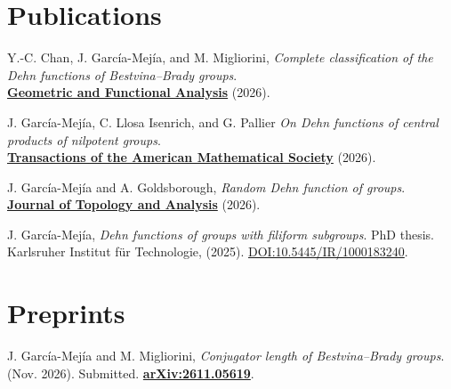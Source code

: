 \documentclass[a4paper,10pt]{article} %
\begin{document}
\section{Publications}

\begin{etaremune}[itemsep=.5em, leftmargin=1.8em, rightmargin=0.5em]

	\item Y.-C. Chan, J. García-Mejía, and M. Migliorini, \emph{Complete classification of the Dehn functions of Bestvina--Brady groups}. \\ {\href{https://doi.org/10.1007/s00039-026-00731-7}{\textbf{Geometric and Functional Analysis}}} (2026).%

	\item J. García-Mejía, C. Llosa Isenrich, and G. Pallier \emph{On Dehn functions of central products of nilpotent groups}.\\ 
	{\href{https://doi.org/10.1090/tran/9708}{\textbf{Transactions of the American Mathematical Society}}} (2026). %
	
	\item J. García-Mejía and A. Goldsborough, \emph{Random Dehn function of groups}. \\
	{\href{https://doi.org/10.1142/S179352532550027X}{\textbf{Journal of Topology and Analysis}}} (2026). %
	
	\item J. García-Mejía, \emph{Dehn functions of groups with filiform subgroups}. PhD thesis. Karlsruher Institut für Technologie, (2025).  {\href{https://publikationen.bibliothek.kit.edu/1000183240}{DOI:10.5445/IR/1000183240}}.
    
\end{etaremune}

\section{Preprints}
%
\begin{etaremune}[itemsep=.5em, leftmargin=1.8em, rightmargin=0.5em]
	
	\item J. García-Mejía and M. Migliorini, \emph{Conjugator length of Bestvina--Brady groups}.\\ 
	(Nov. 2026). Submitted. {\href{https://arxiv.org/abs/2611.05619}{\textbf{arXiv:2611.05619}}}.
    
\end{etaremune}
\end{document}
